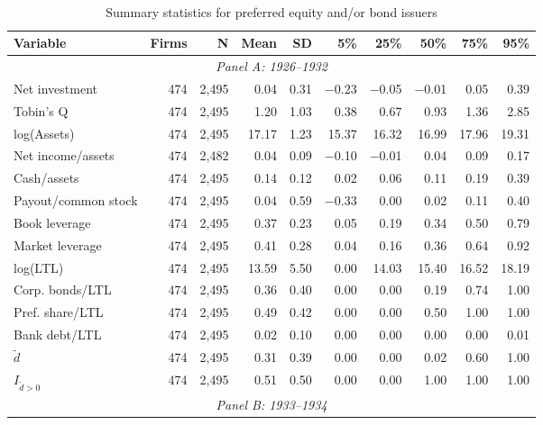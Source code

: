 \begin{table}[p]\centering
    \caption{\\ Summary statistics for preferred equity and/or bond issuers}\scriptsize
    \label{tab:sum_pos}
    \begin{threeparttable}
        \begin{tabular}{lrrrrrrrrr}
            \toprule
            Variable & Firms & N & Mean & SD & 5\% & 25\% & 50\% & 75\% & 95\% \\
            \midrule
            \multicolumn{10}{c}{\textit{Panel A: 1926--1932}} \\
            \midrule
            Net investment & 474 & 2,495 & 0.04 & 0.31 & $-$0.23 & $-$0.05 & $-$0.01 & 0.05 & 0.39 \\
            Tobin's Q & 474 & 2,495 & 1.20 & 1.03 & 0.38 & 0.67 & 0.93 & 1.36 & 2.85 \\
            log(Assets) & 474 & 2,495 & 17.17 & 1.23 & 15.37 & 16.32 & 16.99 & 17.96 & 19.31 \\
            Net income/assets & 474 & 2,482 & 0.04 & 0.09 & $-$0.10 & $-$0.01 & 0.04 & 0.09 & 0.17 \\
            Cash/assets & 474 & 2,495 & 0.14 & 0.12 & 0.02 & 0.06 & 0.11 & 0.19 & 0.39 \\
            Payout/common stock & 474 & 2,495 & 0.04 & 0.59 & $-$0.33 & 0.00 & 0.02 & 0.11 & 0.40 \\
            Book leverage & 474 & 2,495 & 0.37 & 0.23 & 0.05 & 0.19 & 0.34 & 0.50 & 0.79 \\
            Market leverage & 474 & 2,495 & 0.41 & 0.28 & 0.04 & 0.16 & 0.36 & 0.64 & 0.92 \\
            log(LTL) & 474 & 2,495 & 13.59 & 5.50 & 0.00 & 14.03 & 15.40 & 16.52 & 18.19 \\
            Corp. bonds/LTL & 474 & 2,495 & 0.36 & 0.40 & 0.00 & 0.00 & 0.19 & 0.74 & 1.00 \\
            Pref. share/LTL & 474 & 2,495 & 0.49 & 0.42 & 0.00 & 0.00 & 0.50 & 1.00 & 1.00 \\
            Bank debt/LTL & 474 & 2,495 & 0.02 & 0.10 & 0.00 & 0.00 & 0.00 & 0.00 & 0.01 \\
            \ensuremath{\tilde{d}} & 474 & 2,495 & 0.31 & 0.39 & 0.00 & 0.00 & 0.02 & 0.60 & 1.00 \\
            \ensuremath{I_{\tilde{d}>0}} & 474 & 2,495 & 0.51 & 0.50 & 0.00 & 0.00 & 1.00 & 1.00 & 1.00 \\
            \midrule
            \multicolumn{10}{c}{\textit{Panel B: 1933--1934}} \\

\end{tabular}
\end{threeparttable}
\end{table}
